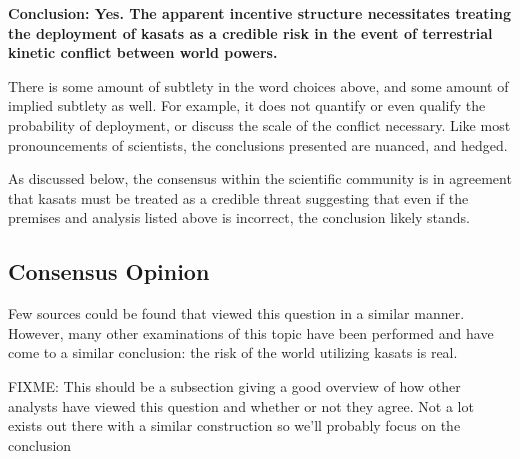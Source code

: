 \begin{blockquote}
  {\bf Conclusion: Yes.  The apparent incentive structure necessitates
    treating the deployment of \acp{kasat} as a credible risk in the
    event of terrestrial kinetic conflict between world powers.}
\end{blockquote}

There is some amount of subtlety in the word choices above, and some
amount of implied subtlety as well.  For example, it does not quantify
or even qualify the probability of deployment, or discuss the scale of
the conflict necessary.  Like most pronouncements of scientists, the
conclusions presented are nuanced, and hedged.

As discussed below, the consensus within the scientific community is
in agreement that \acp{kasat} must be treated as a credible threat
suggesting that even if the premises and analysis listed above is
incorrect, the conclusion likely stands.

\subsection{Consensus Opinion}

Few sources could be found that viewed this question in a similar
manner.  However, many other examinations of this topic have been
performed and have come to a similar conclusion: the risk of the world
utilizing \acp{kasat} is real.

FIXME: This should be a subsection giving a good overview of how other
analysts have viewed this question and whether or not they agree.  Not
a lot exists out there with a similar construction so we'll probably
focus on the conclusion

